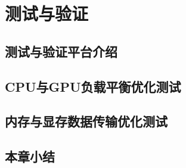 
\chapter{测试与验证}

\section{测试与验证平台介绍}

\section{CPU与GPU负载平衡优化测试}

\section{内存与显存数据传输优化测试}

\section{本章小结}
